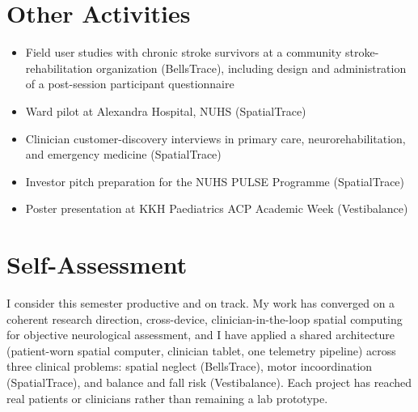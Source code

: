 \documentclass[12pt]{article}
\begin{document}
\section{Other Activities}

\begin{itemize}[leftmargin=1.5em]
    \item Field user studies with chronic stroke survivors at a community stroke-rehabilitation organization (BellsTrace), including design and administration of a post-session participant questionnaire
    \item Ward pilot at Alexandra Hospital, NUHS (SpatialTrace)
    \item Clinician customer-discovery interviews in primary care, neurorehabilitation, and emergency medicine (SpatialTrace)
    \item Investor pitch preparation for the NUHS PULSE Programme (SpatialTrace)
    \item Poster presentation at KKH Paediatrics ACP Academic Week (Vestibalance)
\end{itemize}

\section{Self-Assessment}

I consider this semester productive and on track. My work has converged on a coherent research direction, cross-device, clinician-in-the-loop spatial computing for objective neurological assessment, and I have applied a shared architecture (patient-worn spatial computer, clinician tablet, one telemetry pipeline) across three clinical problems: spatial neglect (BellsTrace), motor incoordination (SpatialTrace), and balance and fall risk (Vestibalance). Each project has reached real patients or clinicians rather than remaining a lab prototype.
\end{document}
